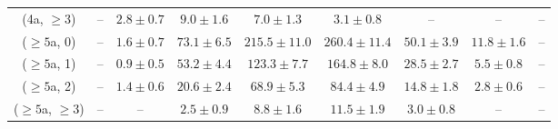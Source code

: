 \begin{table}[h!]
{\begin{tabular}{ccccccccc}
	(4a, $\ge3$) & -- & $2.8\pm 0.7$ & $9.0\pm 1.6$ & $7.0\pm 1.3$ & $3.1\pm 0.8$ & -- & -- & -- \\[0.5ex] 
	($\ge5$a, 0) & -- & $1.6\pm 0.7$ & $73.1\pm 6.5$ & $215.5\pm 11.0$ & $260.4\pm 11.4$ & $50.1\pm 3.9$ & $11.8\pm 1.6$ & -- \\[0.5ex] 
	($\ge5$a, 1) & -- & $0.9\pm 0.5$ & $53.2\pm 4.4$ & $123.3\pm 7.7$ & $164.8\pm 8.0$ & $28.5\pm 2.7$ & $5.5\pm 0.8$ & -- \\[0.5ex] 
	($\ge5$a, 2) & -- & $1.4\pm 0.6$ & $20.6\pm 2.4$ & $68.9\pm 5.3$ & $84.4\pm 4.9$ & $14.8\pm 1.8$ & $2.8\pm 0.6$ & -- \\[0.5ex] 
	($\ge5$a, $\ge3$) & -- & -- & $2.5\pm 0.9$ & $8.8\pm 1.6$ & $11.5\pm 1.9$ & $3.0\pm 0.8$ & -- & -- \\[0.5ex] 
	\hline
	\hline
\end{tabular}}
\end{table}
